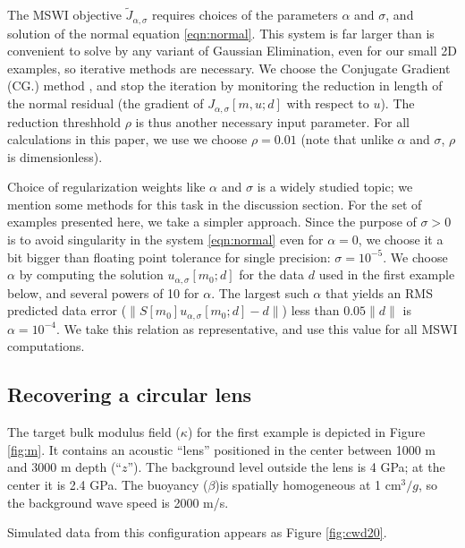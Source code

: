 The MSWI objective $\tilde{J}_{\alpha,\sigma}$ requires choices of the
parameters $\alpha$ and $\sigma$, and solution of the normal equation
\ref{eqn:normal}. This system is far larger than is convenient to solve
by any variant of Gaussian Elimination, even for our small 2D
examples, so iterative methods are 
necessary. We choose the Conjugate Gradient (CG.) method
\cite[]{Dan:67,Steihaug:83,NocedalWright}, and stop the
iteration by monitoring the reduction in length of the normal residual
(the gradient of $J_{\alpha,\sigma}[m,u;d]$ with respect to $u$). The
reduction threshhold $\rho$ is thus another necessary input
parameter. For all calculations in this paper, we use
we choose $\rho = 0.01$ (note that unlike $\alpha$ and $\sigma$,
$\rho$ is dimensionless).

Choice of regularization weights like $\alpha$ and $\sigma$ is a
widely studied topic; we mention some methods for this task in the
discussion section. For the set of examples presented here, we take a
simpler approach. Since the purpose of $\sigma>0$ is to avoid singularity
in the system \ref{eqn:normal} even for $\alpha=0$, we choose it a bit
bigger than floating point tolerance for single precision:
$\sigma = 10^{-5}$. We choose $\alpha$ by computing the solution
$u_{\alpha,\sigma}[m_0;d]$ for the data $d$ used in the first example
below, and several powers of 10 for $\alpha$. The largest such
$\alpha$ that yields an RMS predicted data error
($\|S[m_0]u_{\alpha,\sigma}[m_0;d] - d\|$) less than $0.05 \|d\|$ is
$\alpha = 10^{-4}$. We take this relation as representative, and use
this value for all MSWI computations.

\subsection{Recovering a circular lens}

The target bulk modulus field ($\kappa$) for the first example 
is depicted in Figure \ref{fig:m}. It contains an acoustic ``lens''
positioned in the center between 1000 m and 3000 m depth
(``$z$''). The background level outside the lens is 4 GPa; at the
center it is 2.4 GPa. The
buoyancy ($\beta$)is spatially homogeneous at 1 cm$^3/g$, so the background
wave speed is 2000 m/s.


Simulated data from this configuration appears as Figure
\ref{fig:cwd20}.


